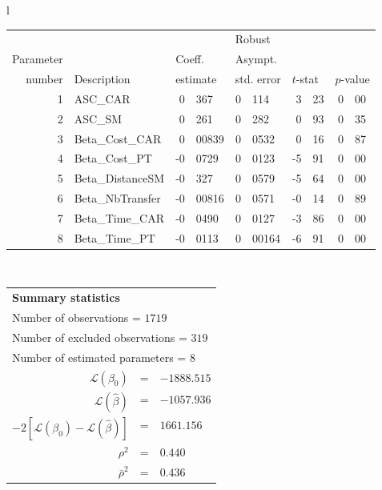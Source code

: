   \begin{tabular}{l}
\begin{tabular}{rlr@{.}lr@{.}lr@{.}lr@{.}l}
         &                       &   \multicolumn{2}{l}{}    & \multicolumn{2}{l}{Robust}  &     \multicolumn{4}{l}{}   \\
Parameter &                       &   \multicolumn{2}{l}{Coeff.}      & \multicolumn{2}{l}{Asympt.}  &     \multicolumn{4}{l}{}   \\
number &  Description                     &   \multicolumn{2}{l}{estimate}      & \multicolumn{2}{l}{std. error}  &   \multicolumn{2}{l}{$t$-stat}  &   \multicolumn{2}{l}{$p$-value}   \\

\hline

1 & ASC_CAR & 0&367 & 0&114 & 3&23 & 0&00\\
2 & ASC_SM & 0&261 & 0&282 & 0&93 & 0&35\\
3 & Beta_Cost_CAR & 0&00839 & 0&0532 & 0&16 & 0&87\\
4 & Beta_Cost_PT & -0&0729 & 0&0123 & -5&91 & 0&00\\
5 & Beta_DistanceSM & -0&327 & 0&0579 & -5&64 & 0&00\\
6 & Beta_NbTransfer & -0&00816 & 0&0571 & -0&14 & 0&89\\
7 & Beta_Time_CAR & -0&0490 & 0&0127 & -3&86 & 0&00\\
8 & Beta_Time_PT & -0&0113 & 0&00164 & -6&91 & 0&00\\
\hline
\end{tabular}
\\
\begin{tabular}{rcl}
\multicolumn{3}{l}{\bf Summary statistics}\\
\multicolumn{3}{l}{ Number of observations = $1719$} \\
\multicolumn{3}{l}{ Number of excluded observations = $319$} \\
\multicolumn{3}{l}{ Number of estimated  parameters = $8$} \\
 $\mathcal{L}(\beta_0)$ &=&  $-1888.515$ \\
 $\mathcal{L}(\hat{\beta})$ &=& $-1057.936 $  \\
 $-2[\mathcal{L}(\beta_0) -\mathcal{L}(\hat{\beta})]$ &=& $1661.156$ \\
    $\rho^2$ &=&   $0.440$ \\
    $\bar{\rho}^2$ &=&    $0.436$ \\
\end{tabular}
  \end{tabular}
